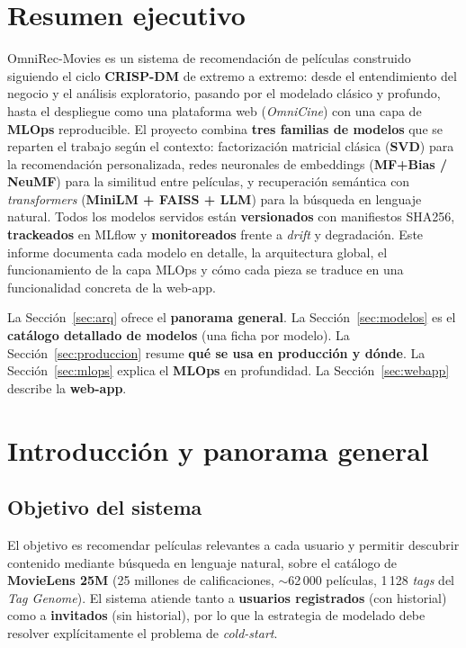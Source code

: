 \documentclass[11pt,a4paper]{article}
\begin{document}
\section*{\color{omniprimary}Resumen ejecutivo}
OmniRec-Movies es un sistema de recomendación de películas construido siguiendo el ciclo \textbf{CRISP-DM} de extremo a extremo: desde el entendimiento del negocio y el análisis exploratorio, pasando por el modelado clásico y profundo, hasta el despliegue como una plataforma web (\textit{OmniCine}) con una capa de \textbf{MLOps} reproducible. El proyecto combina \textbf{tres familias de modelos} que se reparten el trabajo según el contexto: factorización matricial clásica (\textbf{SVD}) para la recomendación personalizada, redes neuronales de embeddings (\textbf{MF+Bias / NeuMF}) para la similitud entre películas, y recuperación semántica con \textit{transformers} (\textbf{MiniLM + FAISS + LLM}) para la búsqueda en lenguaje natural. Todos los modelos servidos están \textbf{versionados} con manifiestos SHA256, \textbf{trackeados} en MLflow y \textbf{monitoreados} frente a \textit{drift} y degradación. Este informe documenta cada modelo en detalle, la arquitectura global, el funcionamiento de la capa MLOps y cómo cada pieza se traduce en una funcionalidad concreta de la web-app.

\vspace{6pt}
\begin{infobox}
La Sección~\ref{sec:arq} ofrece el \textbf{panorama general}. La Sección~\ref{sec:modelos} es el \textbf{catálogo detallado de modelos} (una ficha por modelo). La Sección~\ref{sec:produccion} resume \textbf{qué se usa en producción y dónde}. La Sección~\ref{sec:mlops} explica el \textbf{MLOps} en profundidad. La Sección~\ref{sec:webapp} describe la \textbf{web-app}.
\end{infobox}

\tableofcontents
{}
\newpage
{}

\section{Introducción y panorama general}
\label{sec:intro}

\subsection{Objetivo del sistema}
El objetivo es recomendar películas relevantes a cada usuario y permitir descubrir contenido mediante búsqueda en lenguaje natural, sobre el catálogo de \textbf{MovieLens 25M} (25 millones de calificaciones, $\sim$62\,000 películas, 1\,128 \textit{tags} del \textit{Tag Genome}). El sistema atiende tanto a \textbf{usuarios registrados} (con historial) como a \textbf{invitados} (sin historial), por lo que la estrategia de modelado debe resolver explícitamente el problema de \textit{cold-start}.
\end{document}
